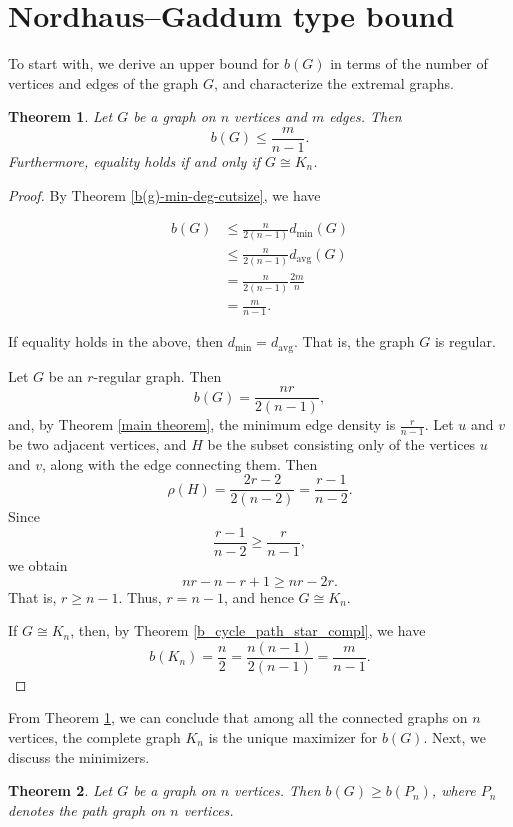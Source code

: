 \documentclass[12pt]{article}
\newtheorem{theorem}{Theorem}[section]
\DeclareMathOperator{\avg}{avg}
\begin{document}
\section{Nordhaus–Gaddum type bound}

To start with, we derive an upper bound for $b(G)$ in terms of the number of vertices and edges of the graph $G$, and characterize the extremal graphs. 
\begin{theorem}\label{edge-bound-b(g)}
    Let $G$ be a graph on $n$ vertices and $m$ edges. Then  $$b(G)\leq\frac{m}{n-1}.$$ Furthermore, equality holds if and only if $ G \cong K_{n}$.
    \label{3}
\end{theorem} 

\begin{proof}
By Theorem   \ref{b(g)-min-deg-cutsize}, we have    

    \begin{align*}
   b(G) &\leq \frac{n}{2(n-1)}d_{\min}(G)\\ 
   &\leq \frac{n}{2(n-1)}d_{\avg}(G) \\
   &=\frac{n}{2(n-1)}  \frac{2m}{n}\\
   &=\frac{m}{n-1}.
     \end{align*}
        
  If equality holds in the above, then $d_{\min}=d_{\avg}$. That is, the graph $G$ is regular. 
    
   Let $G$ be an $r$-regular graph.  Then $$b(G)=\frac{nr}{2(n-1)},$$ and, by Theorem \ref{main theorem}, the minimum edge density is  $\frac{r}{n-1}$. Let $u$ and $v$ be two adjacent vertices, and $H$ be the subset consisting only of the vertices $u$ and $v$, along with the edge connecting them. Then
     $$ \rho(H)=\frac{2r-2}{2(n-2)}=\frac{r-1}{n-2}. $$ Since
    $$\frac {r-1}{n-2} \geq \frac{r}{n-1},$$ we obtain $$nr-n-r+1 \geq nr-2r.$$ That is, $ r\geq n-1$. Thus, $r=n-1$, and hence $G\cong K_n$.
    
    If $G \cong K_n$, then, by Theorem \ref{b_cycle_path_star_compl}, we have 
    $$b(K_n)=\frac{n}{2}=\frac{n(n-1)}{2(n-1)}=\frac{m}{n-1}.$$
    
\end{proof}


    From Theorem \ref{edge-bound-b(g)}, we can conclude that among all the connected graphs on $n$ vertices, the complete graph $K_n$ is the unique maximizer for $b(G)$.  Next, we discuss the minimizers.
    
    \begin{theorem}\label{lower bound}
    Let $G$ be a graph on $n$ vertices. Then $b(G) \geq b(P_n)$, where $P_n$ denotes the path graph on $n$ vertices.
    \end{theorem} 
    
\end{document}
